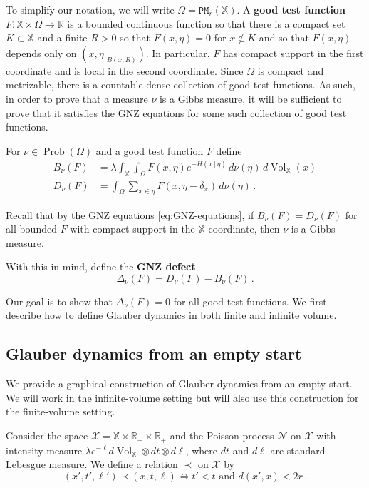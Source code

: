 \documentclass[11pt]{amsart}
\theoremstyle{definition}
\theoremstyle{remark}
\newcommand{\R}{\mathbb{R}}
\newcommand{\bX}{\mathbb{X}}
\newcommand{\cP}{\mathtt{PM}}
\newcommand{\Prob}{\operatorname{Prob}}
\newcommand{\Vol}{\operatorname{Vol}}
\begin{document}
To simplify our notation, we will write $\Omega = \cP_r(\bX)$.   A \textbf{good test function} $F: \bX \times \Omega \to \R$ is a bounded continuous function so that there is a compact set $K \subset \bX$ and a finite $R > 0$ so that $F(x,\eta) = 0$ for $x \notin K$ and so that $F(x,\eta)$ depends only on $(x,\eta|_{B(x,R)})$.  In particular, $F$ has compact support in the first coordinate and is local in the second coordinate.  Since $\Omega$ is compact and metrizable, there is a countable dense collection of good test functions.  As such, in order to prove that a measure $\nu$ is a Gibbs measure, it will be sufficient to prove that it satisfies the GNZ equations for some such collection of good test functions.

For $\nu \in \Prob(\Omega)$ and a good test function $F$ define \begin{align*}
    B_\nu(F) &= \lambda \int_{\bX} \int_{\Omega} F(x,\eta) e^{-H(x\,|\,\eta)} \,d\nu(\eta)\,d\Vol_{\bX}(x) \\
    D_\nu(F) &=  \int_{\Omega} \sum_{x \in \eta} F(x,\eta - \delta_x) \,d\nu(\eta)\,.
\end{align*}

Recall that by the GNZ equations \eqref{eq:GNZ-equations}, if $B_\nu(F) = D_\nu(F)$ for all bounded $F$ with compact support in the $\bX$ coordinate, then $\nu$ is a Gibbs measure.  

With this in mind, define the \textbf{GNZ defect} \begin{equation*}
    \Delta_\nu(F) = D_\nu(F) - B_\nu(F)\,.
\end{equation*}

Our goal is to show that $\Delta_\nu(F) = 0$ for all good test functions.  We first describe how to define Glauber dynamics in both finite and infinite volume.  

\subsection{Glauber dynamics from an empty start}\label{sec:GD-construction}

We provide a graphical construction of Glauber dynamics from an empty start.  We will work in the infinite-volume setting but will also use this construction for the finite-volume setting.

Consider the space $\mathcal{X} = \bX \times \R_+ \times \R_+$ and the Poisson process $\mathcal{N}$ on $\mathcal{X}$ with intensity measure $\lambda e^{-\ell} d\Vol_{\bX} \otimes dt \otimes d\ell$, where $dt$ and $d\ell$ are standard Lebesgue measure.  We define a relation $\prec$ on $\mathcal{X}$ by $$(x',t',\ell') \prec (x,t,\ell) \iff t' < t \text{ and } d(x',x) < 2r\,.$$
\end{document}
